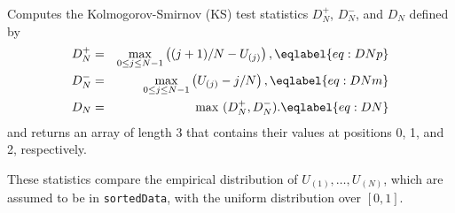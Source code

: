 \begin{tabb} Computes the Kolmogorov-Smirnov (KS) test statistics
 $D_N^+$, $D_N^-$, and $D_N$
 defined by
 \begin {eqnarray}
  D_N^+ &=& \max_{0\le j\le N-1} \left ((j+1)/N - U_{(j)}\right),
                                                    \eqlabel{eq:DNp} \\
  D_N^- &=& \max_{0\le j\le N-1} \left (U_{(j)} - j/N\right),
                                                    \eqlabel{eq:DNm} \\
  D_N   &=& \max\ (D_N^+, D_N^-).                   \eqlabel{eq:DN}
 \end {eqnarray}
 and returns an array of length 3 that contains their values at positions
 0, 1, and 2, respectively.
\iffalse
\begin {eqnarray*}
  \mbox\texttt{ret[0]}&=&D_N^+\\
  \mbox\texttt{ret[1]}&=&D_N^-\\
  \mbox\texttt{ret[2]}&=&D_N
\end {eqnarray*}
\fi
 These statistics compare the empirical distribution of
 $U_{(1)},\dots,U_{(N)}$, which are assumed to be in \texttt{sortedData},
 with the uniform distribution over $[0,1]$.
\end{tabb}
\begin{htmlonly}
\end{htmlonly}
